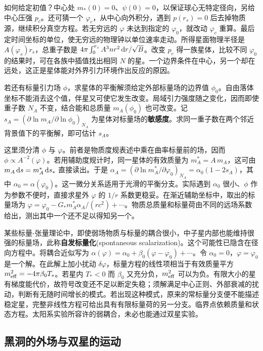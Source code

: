 如何给定初值？中心处 $m_*(0)=0$、$\psi(0)=0$，以保证球心无特定径向，另给中心压强 $p_c$。还可猜一个 $\varphi_c$，从中心向外积分，遇到 $p(r_s)=0$ 后去掉物质源，继续积分真空方程。若无穷远的 $\varphi$ 未达到指定的 $\varphi_0$，就改动 $\varphi_c$ 重算。最后定时间坐标的单位，使无穷远的物理钟以单位速率走动。所得星面物理半径是 $A(\varphi_s)r_s$，总重子数是 $4\pi\int_0^{r_s}A^3n r^2\,\dd r/\sqrt B$。改变 $p_c$ 得一族星体，比较不同 $\varphi_0$ 的结果时，可在各族中插值找出相同 $N$ 的星。一个边界条件在中心，另一个却在远处，这正是星体能对外界引力环境作出反应的原因。

若还有标量引力场 $\phi$，求星体的平衡解须给定外部标量场的边界值 $\phi_0$。自由落体坐标不能消去这个值，伴星又可使它发生改变。局域引力强度随之变化，因而即使重子数 $N_A$ 不变，结合能和总质量 $m_A(\phi_0)$ 也可改变。记 $s_A=(\partial\ln m_A/\partial\ln\phi_0)_{N_A}$ 为星体对标量场的\textbf{敏感度}。求同一重子数在两个邻近背景值下的平衡解，即可估计 $s_A$。

这里须分清 $\phi$ 与 $\varphi$。前者是物质度规表述中乘在曲率标量前的场，因而 $\phi\propto A^{-2}(\varphi)$。若用辅助度规计时，同一星体的有效质量为 $m_A^*=A\,m_A$，这可由 $m_A\,\dd s=m_A^*\,\dd s_*$ 直接读出。于是 $\alpha_A=(\partial\ln m_A^*/\partial\varphi_0)_{N_A}=\alpha_0(1-2s_A)$，其中 $\alpha_0=\alpha(\varphi_0)$。这一微分关系适用于光滑的平衡分支。实际遇到 $\alpha_0$ 很小、$\phi$ 作为参数不便时，直接求星外 $\varphi$ 的 $1/r$ 系数更稳妥。在渐近辅助坐标中，取出的标量场为 $\varphi=\varphi_0-G_*m_A^*\alpha_A/(rc^2)+\cdots$。物质总质量和标量荷由不同的远场系数给出，测出其中一个还不足以得知另一个。

某些标量-张量理论中，即使弱场物质与标量的耦合很小，中子星内部也能维持很强的标量场，此称\textbf{自发标量化}(spontaneous scalarization)。这个可能性已隐含在径向方程中。将耦合近似写为 $\alpha(\varphi)=\alpha_0+\beta_0(\varphi-\varphi_0)+\cdots$。令 $\alpha_0=0$，$\varphi=\varphi_0$ 是一个解。在此解上加小扰动 $\delta\varphi$，标量方程的线性项相当于有效质量平方 $m_{\rm eff}^2=-4\pi\beta_0 T_*$。若星内 $T_*<0$ 而 $\beta_0$ 又充分负，$m_{\rm eff}^2$ 可以为负。有限大小的星有梯度能代价，故符号改变还不足以断定失稳；须解满足中心正则、外部衰减的扰动，判断有无随时间增长的模式。若出现这种模式，原来的常标量分支便不能描述稳定星，完整非线性方程可给出具有有限标量荷的另一分支。临界点依赖质量和状态方程。太阳系实验所容许的弱耦合，未必也能通过双星实验。

\subsection{黑洞的外场与双星的运动}

